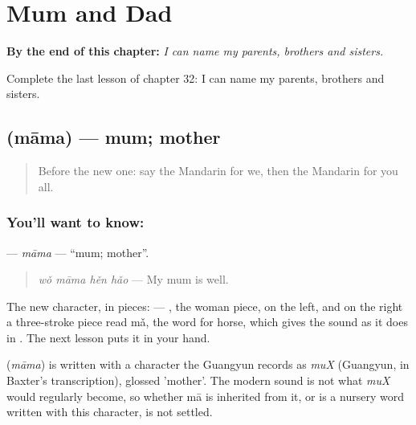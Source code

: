 
\chapter{Mum and Dad}
\label{ch:zh-mum-and-dad}

\begin{chapteropening}
\textbf{By the end of this chapter:} \emph{I can name my parents, brothers and sisters.}

Complete the last lesson of chapter 32: I can name my parents, brothers and sisters.
\end{chapteropening}

\section[\texorpdfstring{\zh{妈妈} (māma)}{妈妈 (māma)}]{ (māma) — mum; mother}

\label{lesson:ZH-C32-mama}



\begin{quote}
Before the new one: say the Mandarin for we, then the Mandarin for you all.
\end{quote}

\subsection*{You'll want to know: }
\textbf{} — \emph{māma} — \textquotedblleft{}mum; mother\textquotedblright{}.

\begin{quote}
\textbf{} \emph{wǒ māma hěn hǎo} — My mum is well.
\end{quote}

The new character, in pieces:  — , the woman piece, on the left, and on the right a three-stroke piece read mǎ, the word for horse, which gives the sound as it does in . The next lesson puts it in your hand.

\begin{cousinweb}
\textbf{} (\emph{māma}) is written with a character the Guangyun records as \emph{muX} (Guangyun, in Baxter's transcription), glossed 'mother'. The modern sound is not what \emph{muX} would regularly become, so whether mā is inherited from it, or is a nursery word written with this character, is not settled.
\end{cousinweb}

